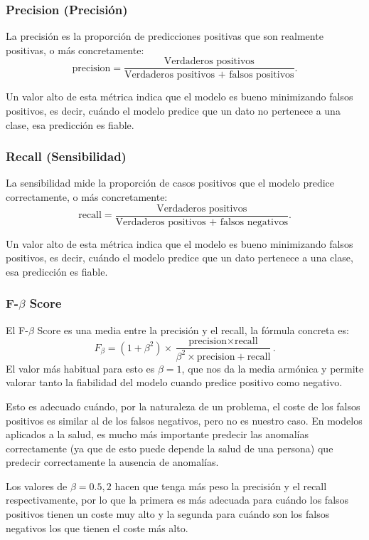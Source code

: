 \subsubsection{Precision (Precisión)}
La precisión es la proporción de predicciones positivas que son realmente positivas, o más concretamente:
\[
\text{precision} = \frac{\text{Verdaderos positivos}}{\text{Verdaderos positivos + falsos positivos}}.
\]

Un valor alto de esta métrica indica que el modelo es bueno minimizando falsos positivos, es decir, cuándo el modelo predice que un dato no pertenece a una clase, esa predicción es fiable.

\subsubsection{Recall (Sensibilidad)}
La sensibilidad mide la proporción de casos positivos que el modelo predice correctamente, o más concretamente:
\[
\text{recall} = \frac{\text{Verdaderos positivos}}{\text{Verdaderos positivos + falsos negativos}}.
\]

Un valor alto de esta métrica indica que el modelo es bueno minimizando falsos positivos, es decir, cuándo el modelo predice que un dato pertenece a una clase, esa predicción es fiable.

\subsubsection{F-$\beta$ Score}
El F-$\beta$ Score es una media entre la precisión y el recall, la fórmula concreta es:
\[
F_\beta = (1+\beta^2)\times \frac{\text{precision} \times \text{recall}}{\beta^2\times\text{precision} + \text{recall}}.
\]
El valor más habitual para esto es $\beta=1$, que nos da la media armónica y permite valorar tanto la fiabilidad del modelo cuando predice positivo como negativo.

Esto es adecuado cuándo, por la naturaleza de un problema, el coste de los falsos positivos es similar al de los falsos negativos, pero no es nuestro caso. En modelos aplicados a la salud, es mucho más importante predecir las anomalías correctamente (ya que de esto puede depende la salud de una persona) que predecir correctamente la ausencia de anomalías.

Los valores de $\beta=0.5,2$ hacen que tenga más peso la precisión y el recall respectivamente, por lo que la primera es más adecuada para cuándo los falsos positivos tienen un coste muy alto y la segunda para cuándo son los falsos negativos los que tienen el coste más alto.


